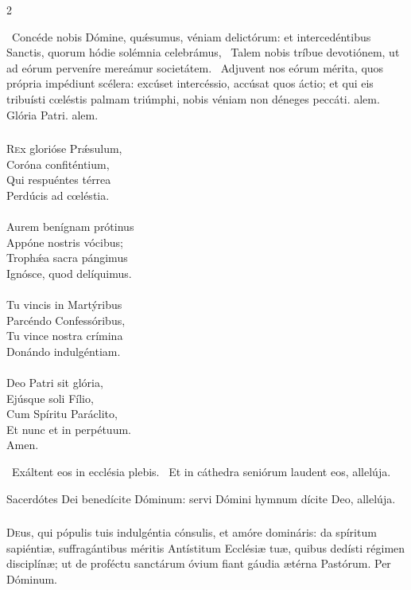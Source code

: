 \documentclass[9pt,twoside]{extarticle}
\begin{document}
\begin{multicols}{2}
\begin{tightlist}{}
\item {}~Concéde nobis Dómine, quǽsumus, véniam delictórum: et intercedéntibus Sanctis, quorum hódie solémnia celebrámus, \textred{*}~Talem nobis tríbue devotiónem, ut ad eórum perveníre mereámur societátem. ~Adjuvent nos eórum mérita, quos própria impédiunt scélera: excúset intercéssio, accúsat quos áctio; et qui eis tribuísti cœléstis palmam triúmphi, nobis véniam non déneges peccáti. alem. Glória Patri. alem.
\end{tightlist}

\subsubsection*{\center {}}
\lettrine{R}ex glorióse Prǽsulum,\\
Coróna confiténtium,\\
Qui respuéntes térrea\\
Perdúcis ad cœléstia.\\
\\
Aurem benígnam prótinus\\
Appóne nostris vócibus;\\
Trophǽa sacra pángimus\\
Ignósce, quod delíquimus.\\
\\
Tu vincis in Martýribus\\
Parcéndo Confessóribus,\\
Tu vince nostra crímina\\
Donándo indulgéntiam.\\
\\
Deo Patri sit glória,\\
Ejúsque soli Fílio,\\
Cum Spíritu Paráclito,\\
Et nunc et in perpétuum.\\
Amen.

\begin{tightlist}{}
\item {}~Exáltent eos in ecclésia plebis. ~Et in cáthedra seniórum laudent eos, allelúja.
\item {} Sacerdótes Dei benedícite Dóminum: servi Dómini hymnum dícite Deo, allelúja.
\end{tightlist}

\subsubsection*{\center {}}
\lettrine{D}eus, qui pópulis tuis indulgéntia cónsulis, et amóre domináris: da spíritum sapiéntiæ, suffragántibus méritis Antístitum Ecclésiæ tuæ, quibus dedísti régimen disciplínæ; ut de proféctu sanctárum óvium fiant gáudia ætérna Pastórum. Per Dóminum.


\end{multicols}
\end{document}
